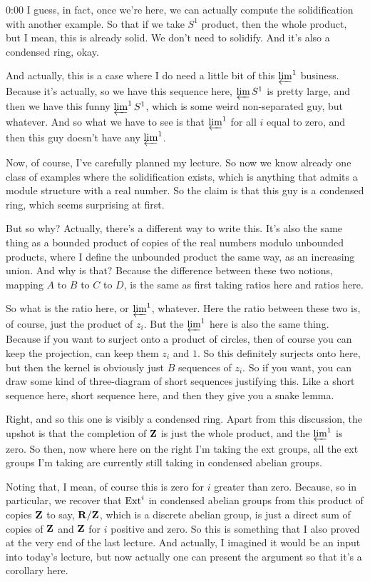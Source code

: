 \begin{unfinished}{0:00}
I guess, in fact, once we're here, we can actually compute the solidification with another example. So that if we take $S^1$ product, then the whole product, but I mean, this is already solid. We don't need to solidify. And it's also a condensed ring, okay.

And actually, this is a case where I do need a little bit of this $\varprojlim^1$ business. Because it's actually, so we have this sequence here, $\varprojlim S^1$ is pretty large, and then we have this funny $\varprojlim^1 S^1$, which is some weird non-separated guy, but whatever. And so what we have to see is that $\varprojlim^1$ for all $i$ equal to zero, and then this guy doesn't have any $\varprojlim^1$.

Now, of course, I've carefully planned my lecture. So now we know already one class of examples where the solidification exists, which is anything that admits a module structure with a real number. So the claim is that this guy is a condensed ring, which seems surprising at first.

But so why? Actually, there's a different way to write this. It's also the same thing as a bounded product of copies of the real numbers modulo unbounded products, where I define the unbounded product the same way, as an increasing union. And why is that? Because the difference between these two notions, mapping $A$ to $B$ to $C$ to $D$, is the same as first taking ratios here and ratios here.

So what is the ratio here, or $\varprojlim^1$, whatever. Here the ratio between these two is, of course, just the product of $z_i$. But the $\varprojlim^1$ here is also the same thing. Because if you want to surject onto a product of circles, then of course you can keep the projection, can keep them $z_i$ and $1$. So this definitely surjects onto here, but then the kernel is obviously just $B$ sequences of $z_i$. So if you want, you can draw some kind of three-diagram of short sequences justifying this. Like a short sequence here, short sequence here, and then they give you a snake lemma.

Right, and so this one is visibly a condensed ring. Apart from this discussion, the upshot is that the completion of $\mathbf Z$ is just the whole product, and the $\varprojlim^1$ is zero. So then, now where here on the right I'm taking the ext groups, all the ext groups I'm taking are currently still taking in condensed abelian groups.

Noting that, I mean, of course this is zero for $i$ greater than zero. Because, so in particular, we recover that $\operatorname{Ext}^i$ in condensed abelian groups from this product of copies $\mathbf Z$ to say, $\mathbf R/\mathbf Z$, which is a discrete abelian group, is just a direct sum of copies of $\mathbf Z$ and $\mathbf Z$ for $i$ positive and zero. So this is something that I also proved at the very end of the last lecture. And actually, I imagined it would be an input into today's lecture, but now actually one can present the argument so that it's a corollary here.


\end{unfinished}

